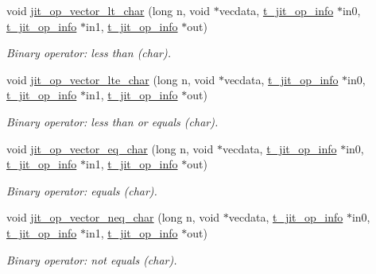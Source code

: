 \begin{DoxyCompactItemize}
void \hyperlink{group__opvecmod_ga5d0dbfe0061f261edeaa94fad0016e2f}{jit\_\-op\_\-vector\_\-lt\_\-char} (long n, void $\ast$vecdata, \hyperlink{structt__jit__op__info}{t\_\-jit\_\-op\_\-info} $\ast$in0, \hyperlink{structt__jit__op__info}{t\_\-jit\_\-op\_\-info} $\ast$in1, \hyperlink{structt__jit__op__info}{t\_\-jit\_\-op\_\-info} $\ast$out)
\begin{DoxyCompactList}\small\item\em Binary operator: less than (char). \item\end{DoxyCompactList}\item 
void \hyperlink{group__opvecmod_ga555351ea64c1fe8079afefd0496fbbdf}{jit\_\-op\_\-vector\_\-lte\_\-char} (long n, void $\ast$vecdata, \hyperlink{structt__jit__op__info}{t\_\-jit\_\-op\_\-info} $\ast$in0, \hyperlink{structt__jit__op__info}{t\_\-jit\_\-op\_\-info} $\ast$in1, \hyperlink{structt__jit__op__info}{t\_\-jit\_\-op\_\-info} $\ast$out)
\begin{DoxyCompactList}\small\item\em Binary operator: less than or equals (char). \item\end{DoxyCompactList}\item 
void \hyperlink{group__opvecmod_ga728da0f73896508903d8be5d225627e1}{jit\_\-op\_\-vector\_\-eq\_\-char} (long n, void $\ast$vecdata, \hyperlink{structt__jit__op__info}{t\_\-jit\_\-op\_\-info} $\ast$in0, \hyperlink{structt__jit__op__info}{t\_\-jit\_\-op\_\-info} $\ast$in1, \hyperlink{structt__jit__op__info}{t\_\-jit\_\-op\_\-info} $\ast$out)
\begin{DoxyCompactList}\small\item\em Binary operator: equals (char). \item\end{DoxyCompactList}\item 
void \hyperlink{group__opvecmod_ga770d0b1d90b002fa00e2f52fe4915983}{jit\_\-op\_\-vector\_\-neq\_\-char} (long n, void $\ast$vecdata, \hyperlink{structt__jit__op__info}{t\_\-jit\_\-op\_\-info} $\ast$in0, \hyperlink{structt__jit__op__info}{t\_\-jit\_\-op\_\-info} $\ast$in1, \hyperlink{structt__jit__op__info}{t\_\-jit\_\-op\_\-info} $\ast$out)
\begin{DoxyCompactList}\small\item\em Binary operator: not equals (char). \item\end{DoxyCompactList}\item 

\end{DoxyCompactItemize}
